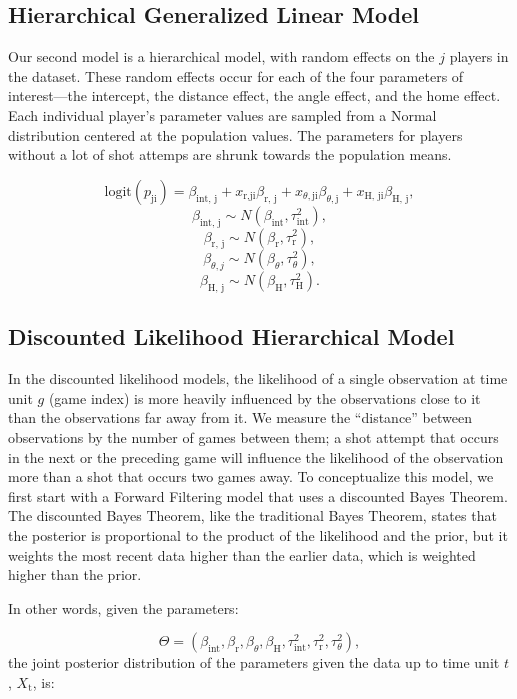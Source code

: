 \documentclass[12pt,twoside]{dukestatscithesis}
\theoremstyle{definition}
\theoremstyle{definition}
\theoremstyle{definition}
\theoremstyle{remark}
\begin{document}
\subsection{Hierarchical Generalized Linear
Model}\label{hierarchical-generalized-linear-model}

Our second model is a hierarchical model, with random effects on the
\(\textit{j}\) players in the dataset. These random effects occur for
each of the four parameters of interest---the intercept, the distance
effect, the angle effect, and the home effect. Each individual player's
parameter values are sampled from a Normal distribution centered at the
population values. The parameters for players without a lot of shot
attemps are shrunk towards the population means.

\[
\text{logit}(p_{\text{ji}}) = 
\beta_{\text{int, j}} +
x_{\text{r,ji}}\beta_{\text{r, j}} +
x_{\theta,\text{ji}}\beta_{\theta, \text{j}} +
x_{\text{H, ji}}\beta_{\text{H, j}},
\] \[
\beta_{\text{int, j}} \sim N(\beta_{\text{int}}, \tau^2_{\text{int}}),
\] \[
\beta_{\text{r, j}} \sim N(\beta_{\text{r}}, \tau^2_{\text{r}}),
\] \[
\beta_{\theta, j} \sim N(\beta_{\theta}, \tau^2_{\theta}),
\] \[
\beta_{\text{H, j}} \sim N(\beta_{\text{H}}, \tau^2_{\text{H}}).
\]

\subsection{Discounted Likelihood Hierarchical
Model}\label{discounted-likelihood-hierarchical-model}

In the discounted likelihood models, the likelihood of a single
observation at time unit \(\textit{g}\) (game index) is more heavily
influenced by the observations close to it than the observations far
away from it. We measure the ``distance'' between observations by the
number of games between them; a shot attempt that occurs in the next or
the preceding game will influence the likelihood of the observation more
than a shot that occurs two games away. To conceptualize this model, we
first start with a Forward Filtering model that uses a discounted Bayes
Theorem. The discounted Bayes Theorem, like the traditional Bayes
Theorem, states that the posterior is proportional to the product of the
likelihood and the prior, but it weights the most recent data higher
than the earlier data, which is weighted higher than the prior.

In other words, given the parameters:

\[
\Theta = (\beta_{\text{int}}, \beta_{\text{r}}, \beta_{\theta}, \beta_\text{H}, \tau^2_{\text{int}}, \tau^2_{\text{r}}, \tau^2_{\theta}),
\] the joint posterior distribution of the parameters given the data up
to time unit \(\textit{t}\), \(X_\text{t}\), is:
\end{document}
